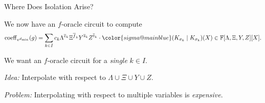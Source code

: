 \documentclass[aspectratio=169]{beamer}
\begin{document}
%
%


%


\begin{frame}{Where Does Isolation Arise?}

  \pause

  We now have an $f$-oracle circuit to compute
  \[
    \coeff_{v^{d_{\min}}}(g) = \sum_{k\in I} c_k \Lambda^{\overline{e}_k}\Xi^{\overline{f}_k}Y^{\overline{s}_k}Z^{\overline{t}_k}\cdot {\color{sigma@mainblue}(K_{\sigma_k}\mid K_{\sigma_k})(X)} \in \F[\Lambda, \Xi, Y, Z][X].
  \]

  \pause

  We want an $f$-oracle circuit for a \emph{single} $k \in I$.

  \pause
  \vspace{10pt}

  \emph{Idea:} Interpolate with respect to $\Lambda \cup \Xi \cup Y \cup Z$.

  \pause
  \vspace{10pt}

  \emph{Problem:} Interpolating with respect to multiple variables is \textcolor{sigma@alertred}{\textit{expensive}}.
\end{frame}
\end{document}
